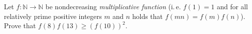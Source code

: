 \problem{}
Let $f \colon \mathbb{N} \to \mathbb{N}$ be nondecreasing \emph{multiplicative function}
(i.\,e. $f(1)=1$ and for all relatively prime positive integers $m$ and $n$ holds that $f(m n) = f(m) f(n)$).
Prove that $f(8) f(13) \geq (f(10))^2$.

\solution

\endproblem

